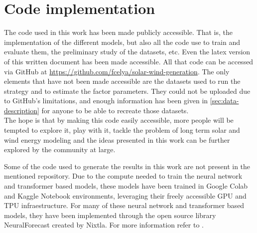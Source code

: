 \section{Code implementation}
\label{sec:code}
The code used in this work has been made publicly accessible. That is, the implementation of the different models, but also all the code use to train and evaluate them, the preliminary study of the datasets, etc. Even the latex version of this written document has been made accessible. All that code can be accessed via GitHub at \href{https://github.com/fcelya/solar-wind-generation}{https://github.com/fcelya/solar-wind-generation}. The only elements that have not been made accessible are the datasets used to run the strategy and to estimate the factor parameters. They could not be uploaded due to GitHub's limitations, and enough information has been given in \autoref{sec:data-description} for anyone to be able to recreate those datasets. \\ The hope is that by making this code easily accessible, more people will be tempted to explore it, play with it, tackle the problem of long term solar and wind energy modeling and the ideas presented in this work can be further explored by the community at large.

Some of the code used to generate the results in this work are not present in the mentioned repository. Due to the compute needed to train the neural network and transformer based models, these models have been trained in Google Colab and Kaggle Notebook environments, leveraging their freely accessible GPU and TPU infraestructure. For many of these neural network and transformer based models, they have been implemented through the open source library NeuralForecast created by Nixtla. For more information refer to \cite{olivares2022library_neuralforecast}.